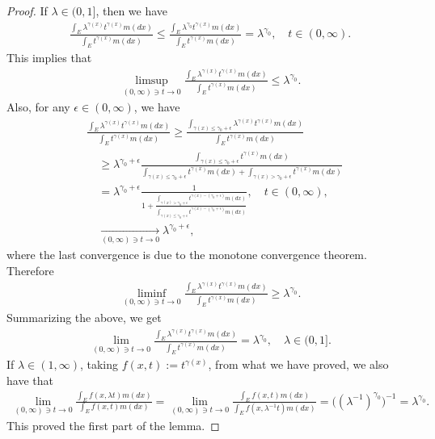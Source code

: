 \documentclass[12pt,a4paper]{amsart}
\theoremstyle{definition}
\numberwithin{equation}{section}
\begin{document}
\begin{proof}
	If $\lambda \in (0,1]$, then we have
  \begin{align}
    \frac{\int_E \lambda^{\gamma(x)} t^{\gamma(x)} m(dx)}{\int_E t^{\gamma(x)} m(dx)}
    \leq \frac{\int_E \lambda^{\gamma_0} t^{\gamma(x)} m(dx)}{\int_E t^{\gamma(x)} m(dx)}
    = \lambda^{\gamma_0},
    \quad t\in (0,\infty).
  \end{align}
	This implies that
  \begin{align}
    \limsup_{(0,\infty) \ni t\to 0}\frac{\int_E \lambda^{\gamma(x)} t^{\gamma(x)} m(dx)}{\int_E t^{\gamma(x)} m(dx)}	
    \leq \lambda ^{\gamma_0}.
  \end{align}
	Also, for any $\epsilon \in (0,\infty)$, we have
  \begin{align}
    &\frac{\int_E \lambda^{\gamma(x)} t^{\gamma(x)} m(dx)}{\int_E t^{\gamma(x)} m(dx)}
      \geq \frac{ \int_{ \gamma(x) \leq  \gamma_0 + \epsilon } \lambda^{ \gamma(x) } t^{ \gamma(x)} m(dx) } { \int_E t^{ \gamma(x) } m(dx) }
    \\&\quad \geq \lambda^{ \gamma_0 + \epsilon} \frac{ \int_{ \gamma(x) \leq \gamma_0 + \epsilon } t^{ \gamma(x)} m(dx) } { \int_{ \gamma(x) \leq \gamma_0 + \epsilon}t^{\gamma(x)}m(dx)+ \int_{\gamma(x) > \gamma_0 + \epsilon} t^{\gamma(x)}m(dx)}
    \\&\quad = \lambda^{\gamma_0 + \epsilon} \frac{1}{1+ \frac{\int_{\gamma(x) > \gamma_0 + \epsilon}t^{\gamma(x) - (\gamma_0 + \epsilon)}m(dx)}{\int_{\gamma(x) \leq \gamma_0 + \epsilon}t^{\gamma(x)- (\gamma_0 + \epsilon)}m(dx)}},
    \quad t\in (0, \infty),
    \\&\quad \xrightarrow[(0,\infty) \ni t\to 0]{}
    \lambda ^{\gamma_0 + \epsilon},
  \end{align}
	where the last convergence is due to the monotone convergence theorem.
	Therefore
  \begin{align}
    \liminf_{(0,\infty) \ni t\to 0}\frac{\int_E \lambda^{\gamma(x)} t^{\gamma(x)} m(dx)}{\int_E t^{\gamma(x)} m(dx)}
    \geq \lambda ^{\gamma_0}.
  \end{align}
	Summarizing the above,  we get
  \begin{align}
    \lim_{(0,\infty) \ni t\to 0}\frac{\int_E \lambda^{\gamma(x)} t^{\gamma(x)} m(dx)}{\int_E t^{\gamma(x)} m(dx)}
    = \lambda ^{\gamma_0},	
    \quad \lambda \in (0,1].
  \end{align}
	If $\lambda \in (1,\infty)$, taking $f(x, t):= t^{\gamma(x)}$, from what we have proved, we also have that
  \begin{align}
    \lim_{(0,\infty)\ni t\to 0}\frac{\int_E f(x,\lambda t)m(dx)}{\int_E f(x, t)m(dx)}
    = \lim_{(0,\infty)\ni t\to 0}\frac{\int_E f(x,t)m(dx)}{\int_E f(x, \lambda^{-1} t)m(dx)}
    = \big((\lambda^{-1})^{\gamma_0} \big)^{-1}
    = \lambda ^{\gamma_0}.
  \end{align}
	This proved the first part of the lemma.
	

\end{proof}
\end{document}
